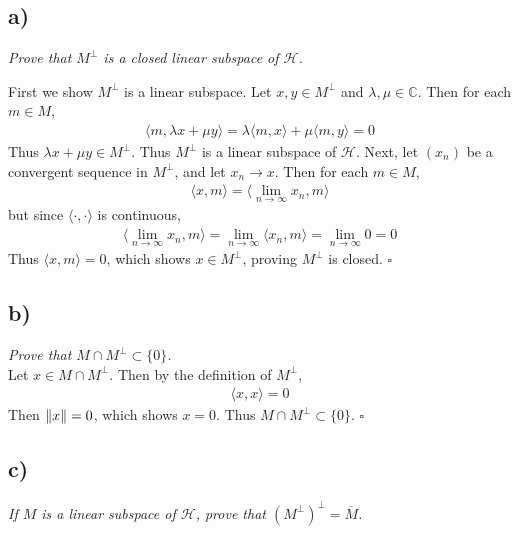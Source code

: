 \documentclass[12pt]{article}
\theoremstyle{plain}
\begin{document}
\subsection*{ a)}
\emph{Prove that $M^\perp$ is a closed linear subspace of $\mathcal{H}$.}

First we show $M^\perp$ is a linear subspace.  Let $x, y \in M^\perp$ and $\lambda, \mu \in \mathbb{C}$.  Then for each $m \in M$,
\begin{align*}
    \langle m, \lambda x + \mu y\rangle = \lambda\langle m, x\rangle + \mu\langle m, y\rangle = 0
\end{align*}
Thus $\lambda x + \mu y \in M^\perp$.  Thus $M^\perp$ is a linear subspace of $\mathcal{H}$.  Next, let $(x_n)$ be a convergent sequence in $M^\perp$, and let $x_n \rightarrow x$.  Then for each $m \in M$,
\begin{align*}
    \langle x, m \rangle = \langle \lim_{n\rightarrow \infty} x_n, m\rangle
\end{align*}
but since $\langle \cdot, \cdot \rangle$ is continuous,
\begin{align*}
    \langle \lim_{n\rightarrow \infty} x_n, m\rangle = \lim_{n\rightarrow \infty}\langle x_n, m\rangle = \lim_{n\rightarrow \infty} 0 = 0
\end{align*}
Thus $\langle x, m \rangle = 0$, which shows $x \in M^\perp$, proving $M^\perp$ is closed. \hfill $\square$

\subsection*{ b)}
\emph{Prove that $M \cap M^\perp \subset \{0\}$.} \\

Let $x \in M \cap M^\perp$.  Then by the definition of $M^\perp$,
\begin{align*}
    \langle x, x\rangle = 0
\end{align*}
Then $\norm{x} = 0$, which shows $x = 0$.  Thus $M \cap M^\perp \subset \{0\}$. \hfill $\square$

\subsection*{ c)}
\emph{If $M$ is a linear subspace of $\mathcal{H}$, prove that $(M^\perp)^\perp = \overline{M}$.} \\
\end{document}
